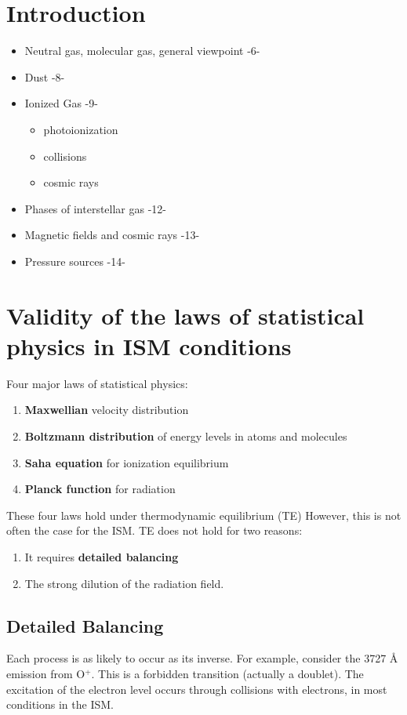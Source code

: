 \documentclass[12pt]{article}
\begin{document}

\section{Introduction}
\begin{itemize}
  \item Neutral gas, molecular gas, general viewpoint -6-
  \item Dust -8-
  \item Ionized Gas -9-
      \begin{itemize}
          \item photoionization
          \item collisions
          \item cosmic rays
      \end{itemize}
  \item Phases of interstellar gas -12-
  \item Magnetic fields and cosmic rays -13-
  \item Pressure sources -14-
\end{itemize}

\section{Validity of the laws of statistical physics in ISM conditions}
Four major laws of statistical physics:
\begin{enumerate}
    \item \textbf{Maxwellian} velocity distribution
    \item \textbf{Boltzmann distribution} of energy levels in atoms and molecules
    \item \textbf{Saha equation} for ionization equilibrium
    \item \textbf{Planck function} for radiation
\end{enumerate}
These four laws hold under thermodynamic equilibrium (TE)
However, this is not often the case for the ISM\@.
TE does not hold for two reasons:
\begin{enumerate}
    \item It requires \textbf{detailed balancing}
    \item The strong dilution of the radiation field.
\end{enumerate}
\subsection{Detailed Balancing}
Each process is as likely to occur as its inverse. For example, consider the
3727 \AA{} emission from O$^{+}$. This is a forbidden transition (actually a
doublet). The excitation of the electron level occurs through collisions with
electrons, in most conditions in the ISM.
\end{document}
